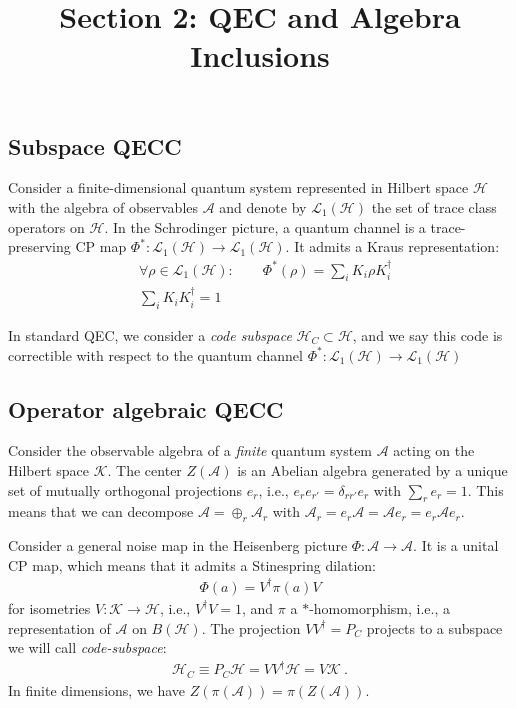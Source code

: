 \documentclass[11pt]{article}
\title{Section 2: QEC and Algebra Inclusions}
\author{}
\date{}
\newcommand{\mH}{\mathcal{H}}
\newcommand{\mA}{\mathcal{A}}
\newcommand{\mK}{\mathcal{K}}
\newcommand{\nn}{\nonumber}
\begin{document}
\maketitle

\subsection{Subspace QECC}

Consider a finite-dimensional quantum system represented in Hilbert space $\mH$ with the algebra of observables $\mA$ and denote by $\mathcal{L}_1(\mH)$ the set of trace class operators on $\mH$. In the Schrodinger picture, a quantum channel is a trace-preserving CP map $\Phi^*:\mathcal{L}_1(\mH)\to \mathcal{L}_1(\mH)$. It admits a Kraus representation:
\begin{align}
    &\forall\rho\in \mathcal{L}_1(\mH):\qquad \Phi^*(\rho)=\sum_i K_i \rho K_i^\dagger\nn\\
    &\sum_i K_i K_i^\dagger=1
\end{align}


In standard QEC, we consider a {\it code subspace} $\mH_C\subset \mH$, and we say this code is correctible with respect to the quantum channel $\Phi^*:\mathcal{L}_1(\mH)\to \mathcal{L}_1(\mH)$ 

\subsection{Operator algebraic QECC}

Consider the observable algebra of a {\it finite} quantum system $\mA$ acting on the Hilbert space $\mK$. The center $Z(\mA)$ is an Abelian algebra generated by a unique set of mutually orthogonal projections $e_r$, i.e., $e_r e_{r'}=\delta_{rr'}e_r$ with $\sum_r e_r=1$. This means that we can decompose $\mA=\oplus_r \mA_r$ with $\mA_r=e_r\mA=\mA e_r=e_r \mA e_r$. 

Consider a general noise map in the Heisenberg picture $\Phi:\mA\to \mA$. 
It is a unital CP map, which means that it admits a Stinespring dilation:
\begin{align}
    \Phi(a)=V^\dagger \pi(a) V
\end{align}
for isometries $V:\mK\to \mH$, i.e., $V^\dagger V=1$, and $\pi$ a $*$-homomorphism, i.e., a representation of $\mA$ on $B(\mH)$. The projection $VV^\dagger=P_C$ projects to a subspace we will call {\it code-subspace}:
\begin{align}
    \mH_C\equiv P_C\mH=VV^\dagger\mH=V\mK\ .
\end{align}
In finite dimensions, we have $Z(\pi(\mA))=\pi(Z(\mA))$. 
\end{document}
